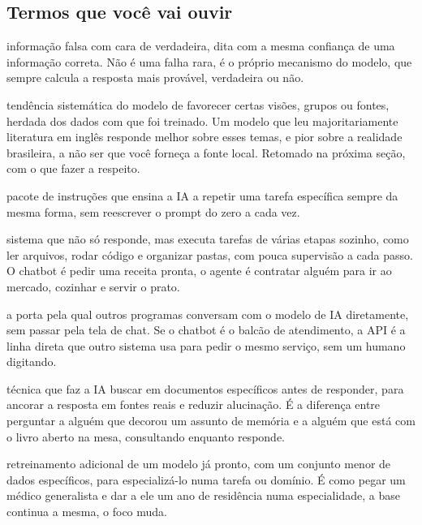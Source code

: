 \documentclass[11pt,a4paper]{article}
\begin{document}
\subsection*{Termos que você vai ouvir}
\begin{description}[style=nextline,leftmargin=0pt,itemsep=6pt]
  \item[\poppinsmed\color{azulUNI}Alucinação] informação falsa com cara de verdadeira, dita com a mesma confiança de uma informação correta. Não é uma falha rara, é o próprio mecanismo do modelo, que sempre calcula a resposta mais provável, verdadeira ou não.
  \item[\poppinsmed\color{azulUNI}Viés algorítmico] tendência sistemática do modelo de favorecer certas visões, grupos ou fontes, herdada dos dados com que foi treinado. Um modelo que leu majoritariamente literatura em inglês responde melhor sobre esses temas, e pior sobre a realidade brasileira, a não ser que você forneça a fonte local. Retomado na próxima seção, com o que fazer a respeito.
  \item[\poppinsmed\color{azulUNI}Habilidade/Skill] pacote de instruções que ensina a IA a repetir uma tarefa específica sempre da mesma forma, sem reescrever o prompt do zero a cada vez.
  \item[\poppinsmed\color{azulUNI}Agente (de IA)] sistema que não só responde, mas executa tarefas de várias etapas sozinho, como ler arquivos, rodar código e organizar pastas, com pouca supervisão a cada passo. O chatbot é pedir uma receita pronta, o agente é contratar alguém para ir ao mercado, cozinhar e servir o prato.
  \item[\poppinsmed\color{azulUNI}API] a porta pela qual outros programas conversam com o modelo de IA diretamente, sem passar pela tela de chat. Se o chatbot é o balcão de atendimento, a API é a linha direta que outro sistema usa para pedir o mesmo serviço, sem um humano digitando.
  \item[\poppinsmed\color{azulUNI}RAG (geração aumentada por recuperação)] técnica que faz a IA buscar em documentos específicos antes de responder, para ancorar a resposta em fontes reais e reduzir alucinação. É a diferença entre perguntar a alguém que decorou um assunto de memória e a alguém que está com o livro aberto na mesa, consultando enquanto responde.
  \item[\poppinsmed\color{azulUNI}Fine-tuning (ajuste fino)] retreinamento adicional de um modelo já pronto, com um conjunto menor de dados específicos, para especializá-lo numa tarefa ou domínio. É como pegar um médico generalista e dar a ele um ano de residência numa especialidade, a base continua a mesma, o foco muda.

\end{description}
\end{document}
